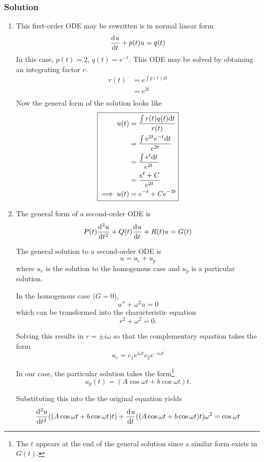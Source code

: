\documentclass[12pt]{article}
\begin{document}
\subsubsection*{Solution}
\begin{enumerate}
\item This first-order ODE may be rewritten is in normal linear form
  $$\od{u}{t} + p(t)u = q(t)$$
  In this case, $p(t)=2$, $q(t)=e^{-t}$. This ODE may be solved by obtaining an
  integrating factor $r$.
  \begin{equation}
    \label{eq:1a-integrating-factor}
    \begin{aligned}
      r(t) &= e^{\int p(t) \dd{t}} \\
      &=e^{2t} \\
    \end{aligned}
  \end{equation}
  Now the general form of the solution looks like
  \begin{equation} \boxed{
    \label{eq:1a-general-form}
    \begin{aligned}
      u(t) &= \frac{\int r(t)q(t)\dd{t}}{r(t)} \\
      &= \frac{\int e^{2t}e^{-t}\dd{t}}{e^{2t}} \\
      &= \frac{\int e^{t}\dd{t}}{e^{2t}} \\
      &= \frac{e^t+C}{e^{2t}} \\
      \implies u(t) &= e^{-t} + Ce^{-2t} \\
    \end{aligned}
  }
  \end{equation}
\item The general form of a second-order ODE is
  $$P(t)\od[2]{u}{t} + Q(t)\od{u}{t} + R(t)u = G(t)$$

  The general solution to a second-order ODE is $$u = u_c + u_p$$ where $u_c$ is
  the solution to the homogenous case and $u_p$ is a particular solution.

  In the homogenous case ($G=0$),
  $$u''+\omega^2u=0$$
  which can be transformed into the characteristic equation
  $$r^2+\omega^2=0.$$

  Solving this results in $r=\pm i\omega$ so that the complementary equation
  takes the form
  $$u_c = c_1e^{i\omega t}c_2e^{-i\omega t}$$

  In our case, the particular solution takes the form\footnote{The $t$ appears
    at the end of the general solution since a similar form exists in $G(t)$.}
  $$u_p(t) = (A\cos \omega t + b\cos \omega t)t.$$

  Substituting this into the the original equation yields
  $$\od[2]{u}{t}((A\cos \omega t + b\cos \omega t)t) + \od{u}{t}((A\cos \omega t
  + b\cos \omega t)t)\omega^2
  = \cos \omega t
  $$

  \todo[]
\end{enumerate}
\end{document}
